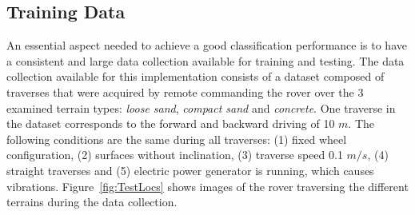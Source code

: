 \subsection{Training Data}

An essential aspect needed to achieve a good classification performance is to have a consistent and large data collection available for training and testing. 
The data collection available for this implementation consists of a dataset composed of traverses that were acquired by remote commanding the rover over the 3 examined terrain types: \emph{loose sand}, \emph{compact sand} and \emph{concrete}. 
One traverse in the dataset corresponds to the forward and backward driving of 10 $m$. 
The following conditions are the same during all traverses: (1) fixed wheel configuration, (2) surfaces without inclination, (3) traverse speed 0.1 $m/s$, (4) straight traverses and (5) electric power generator is running, which causes vibrations.
Figure~\ref{fig:TestLocs} shows images of the rover traversing the different terrains during the data collection.



